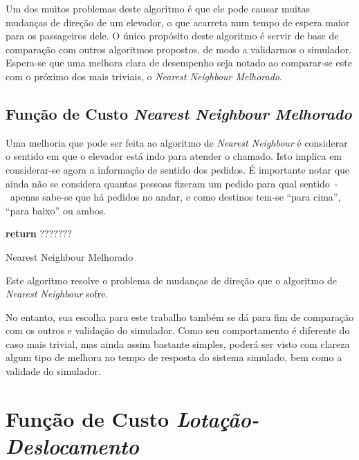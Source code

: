 Um dos muitos problemas deste algoritmo é que ele pode causar muitas mudanças de
direção de um elevador, o que acarreta num tempo de espera maior para os
passageiros dele. O único propósito deste algoritmo é servir de base de
comparação com outros algoritmos propostos, de modo a validarmos o simulador.
Espera-se que uma melhora clara de desempenho seja notado ao comparar-se este
com o próximo dos mais triviais, o \textit{Nearest Neighbour Melhorado}.


\subsection{\label{sec:ai:nnm}Função de Custo \textit{Nearest Neighbour
Melhorado}}

Uma melhoria que pode ser feita ao algoritmo de \textit{Nearest Neighbour}
é considerar o sentido em que o elevador está indo para atender o chamado. Isto
implica em considerar-se agora a informação de sentido dos pedidos. É importante
notar que ainda não se considera quantas pessoas fizeram um pedido para qual
sentido~-~apenas sabe-se que há pedidos no andar, e como destinos tem-se ``para
cima'', ``para baixo'' ou ambos.

\begin{algorithm}[htb]
\begin{center}
\begin{algorithmic}[1]
  \State \textbf{return} $???????$
\EndFunction
\end{algorithmic}
\end{center}
\caption
   {\label{alg:nnm}Nearest Neighbour Melhorado}
\end{algorithm}

Este algoritmo resolve o problema de mudanças de direção que o algoritmo de
\textit{Nearest Neighbour} sofre.

No entanto, sua escolha para este trabalho também se dá para fim de comparação
com os outros e validação do simulador. Como seu comportamento é diferente do
caso mais trivial, mas ainda assim bastante simples, poderá ser visto com clareza
algum tipo de melhora no tempo de resposta do sistema simulado, bem como a validade do simulador.

\section{\label{sec:ai:lotacao}Função de Custo \textit{Lotação-Deslocamento}}

